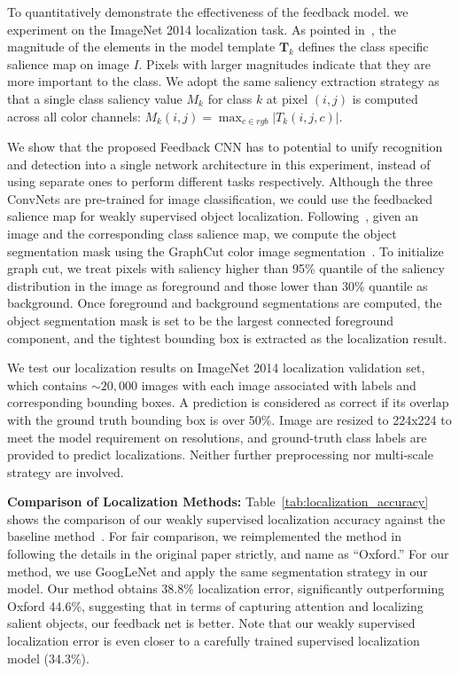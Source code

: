 To quantitatively demonstrate the effectiveness of the feedback model. we experiment on the ImageNet 2014 localization task.
%
As pointed in~\cite{simonyan2013deep}, the magnitude of the elements in the model template $\mathbf{T}_k$ defines the class specific salience map on image $I$. Pixels with larger magnitudes indicate that they are more important to the class. We adopt the same saliency extraction strategy as~\cite{simonyan2013deep} that a single class saliency value $M_k$ for class $k$ at pixel $(i,j)$ is computed across all color channels: $M_k(i,j) = \max_{c \in rgb} | T_k(i,j,c) |$.

We show that the proposed Feedback CNN has to potential to unify recognition and detection into a single network architecture in this experiment, instead of using separate ones to perform different tasks respectively. Although the three ConvNets are pre-trained for image classification, we could use the feedbacked salience map for weakly supervised object localization. Following~\cite{simonyan2013deep}, given an image and the corresponding class salience map, we compute the object segmentation mask using the GraphCut color image segmentation~\cite{yuri2001interactive}. To initialize graph cut, we treat pixels with saliency higher than 95\% quantile of the saliency distribution in the image as foreground and those lower than 30\% quantile as background. Once foreground and background segmentations are computed, the object segmentation mask is set to be the largest connected foreground component, and the tightest bounding box is extracted as the localization result.

We test our localization results on ImageNet 2014 localization validation set, which contains $\sim20,000$ images with each image associated with labels and corresponding bounding boxes. A prediction is considered as correct if its overlap with the ground truth bounding box is over 50\%. Image are resized  to 224x224 to meet the model requirement on resolutions, and ground-truth class labels are provided to predict localizations. Neither further preprocessing nor multi-scale strategy are involved.

\textbf{Comparison of Localization Methods:} Table~\ref{tab:localization_accuracy} shows the comparison of our weakly supervised localization accuracy against the baseline method~\cite{simonyan2013deep}. For fair comparison, we reimplemented the method in~\cite{simonyan2013deep} following the details in the original paper strictly, and name as ``Oxford.'' For our method, we use GoogLeNet and apply the same segmentation strategy in our model. Our method obtains 38.8\% localization error, significantly outperforming Oxford 44.6\%, suggesting that in terms of capturing attention and localizing salient objects, our feedback net is better. Note that our weakly supervised localization error is even closer to a carefully trained supervised localization model (34.3\%).

